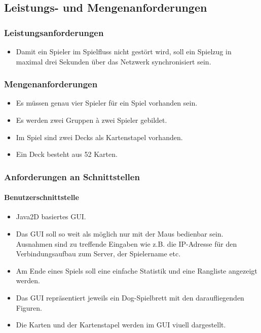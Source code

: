 \documentclass[a4paper,12pt,halfparskip,DIV14]{scrartcl}
\begin{document}
\subsection{Leistungs- und Mengenanforderungen}\label{sub:leistungs_und_mengenanforderungen} %
\subsubsection{Leistungsanforderungen}\label{ssub:leistungsanforderungen} %
\begin{itemize}
	\item Damit ein Spieler im Spielfluss nicht gestört wird, soll ein Spielzug in maximal drei Sekunden über das Netzwerk synchronisiert sein.
\end{itemize}
\subsubsection{Mengenanforderungen}\label{ssub:mengenanforderungen} %
\begin{itemize}
	\item Es müssen genau vier Spieler für ein Spiel vorhanden sein.
	\item Es werden zwei Gruppen à zwei Spieler gebildet.
	\item Im Spiel sind zwei Decks als Kartenstapel vorhanden.
	\item Ein Deck besteht aus 52 Karten.
\end{itemize}

\subsubsection{Anforderungen an Schnittstellen}\label{ssub:anforderungen_an_schnittstellen} %
\paragraph{Benutzerschnittstelle}\label{ssub:benutzerschnittstelle} %
\begin{itemize}
	\item Java2D basiertes GUI.
	\item Das GUI soll so weit als möglich nur mit der Maus bedienbar sein. Ausnahmen sind zu treffende Eingaben wie z.B. die IP-Adresse für den Verbindungsaufbau zum Server, der Spielername etc.
	\item Am Ende eines Spiels soll eine einfache Statistik und eine Rangliste angezeigt werden.
	\item Das GUI repräsentiert jeweils ein Dog-Spielbrett mit den daraufliegenden Figuren.
	\item Die Karten und der Kartenstapel werden im GUI viuell dargestellt.
\end{itemize}
\end{document}
